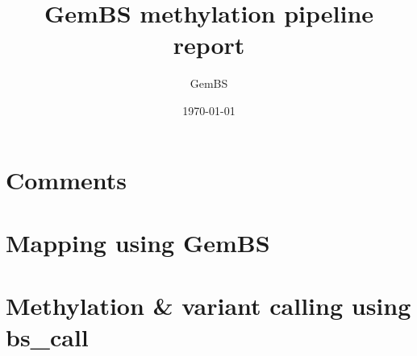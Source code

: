 \documentclass[a4paper,10pt,oneside]{extras/gembsbook_default}
\title{GemBS methylation pipeline report}
\author{GemBS}
\date{\today}
\begin{document}
\maketitle
\tableofcontents
\ifdefined\comment
  \chapter{Comments}
  \parbox{\linewidth}{\raggedright\comment}
\fi
\chapter{Mapping using GemBS}

\chapter{Methylation \& variant calling using bs\_call}

\end{document}

